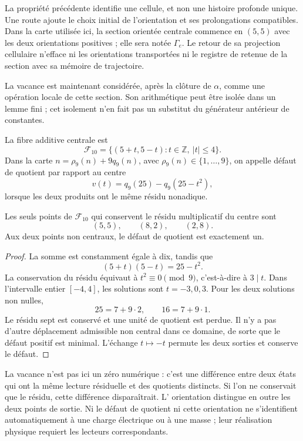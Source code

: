 La propriété précédente identifie une cellule, et non une histoire profonde
unique. Une route ajoute le choix initial de l'orientation et ses
prolongations compatibles. Dans la carte utilisée ici, la section
orientée centrale commence en \((5,5)\) avec les deux orientations
positives ; elle sera notée \(\Gamma_e\). Le retour de sa projection
cellulaire n'efface ni les orientations transportées ni le registre de
retenue de la section avec sa mémoire de trajectoire.

La vacance est maintenant considérée, après la clôture de \(\alpha\), comme
une opération locale de cette section. Son arithmétique peut être isolée dans un
lemme fini ; cet isolement n'en fait pas un substitut du
générateur antérieur de constantes.

\begin{definition}
La fibre additive centrale est
\[
 \mathcal F_{10}
 =\{(5+t,5-t):t\in\mathbb Z,\ |t|\leq4\}.
\]
Dans la carte \(n=\rho_9(n)+9q_9(n)\), avec \(\rho_9(n)\in\{1,\ldots,9\}\), on appelle défaut de quotient par rapport au centre
\[
 v(t)=q_9(25)-q_9(25-t^2),
\]
lorsque les deux produits ont le même résidu nonadique.
\end{definition}

\begin{lemma}
Les seuls points de \(\mathcal F_{10}\) qui conservent le résidu
multiplicatif du centre sont
\[
 (5,5),\qquad (8,2),\qquad (2,8).
\]
Aux deux points non centraux, le défaut de quotient est exactement un.
\end{lemma}
\begin{proof}
La somme est constamment égale à dix, tandis que
\[
 (5+t)(5-t)=25-t^2.
\]
La conservation du résidu équivaut à \(t^2\equiv0\pmod9\), c'est-à-dire à \(3\mid t\). Dans l'intervalle entier \([-4,4]\), les solutions sont \(t=-3,0,3\). Pour les deux solutions non nulles,
\[
 25=7+9\cdot2,\qquad16=7+9\cdot1.
\]
Le résidu sept est conservé et une unité de quotient est perdue. Il n'y a
pas d'autre déplacement admissible non central dans ce domaine, de sorte que le
défaut positif est minimal. L'échange \(t\mapsto-t\) permute les
deux sorties et conserve le défaut.
\end{proof}

La vacance n'est pas ici un zéro numérique : c'est une différence entre deux
états qui ont la même lecture résiduelle et des quotients distincts. Si l'on
ne conservait que le résidu, cette différence disparaîtrait. L'
orientation distingue en outre les deux points de sortie. Ni le défaut de
quotient ni cette orientation ne s'identifient automatiquement à une charge
électrique ou à une masse ; leur réalisation physique requiert les lecteurs
correspondants.


